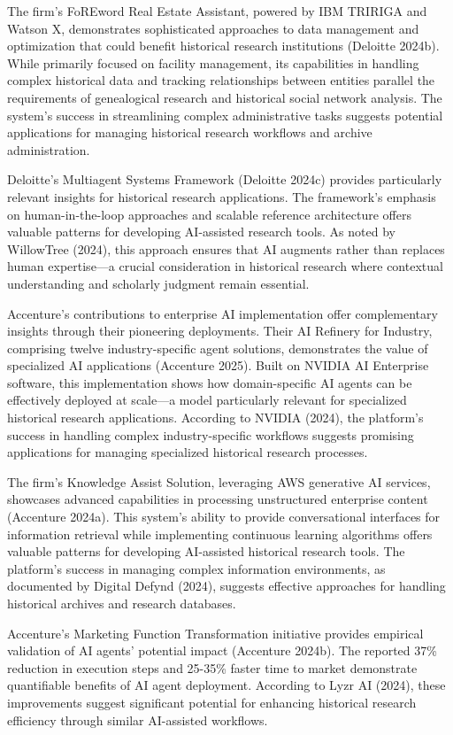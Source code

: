 \documentclass[
]{article}
\begin{document}
The firm's FoREword Real Estate Assistant, powered by IBM TRIRIGA and
Watson X, demonstrates sophisticated approaches to data management and
optimization that could benefit historical research institutions
(Deloitte 2024b). While primarily focused on facility management, its
capabilities in handling complex historical data and tracking
relationships between entities parallel the requirements of genealogical
research and historical social network analysis. The system's success in
streamlining complex administrative tasks suggests potential
applications for managing historical research workflows and archive
administration.

Deloitte's Multiagent Systems Framework (Deloitte 2024c) provides
particularly relevant insights for historical research applications. The
framework's emphasis on human-in-the-loop approaches and scalable
reference architecture offers valuable patterns for developing
AI-assisted research tools. As noted by WillowTree (2024), this approach
ensures that AI augments rather than replaces human expertise---a
crucial consideration in historical research where contextual
understanding and scholarly judgment remain essential.

Accenture's contributions to enterprise AI implementation offer
complementary insights through their pioneering deployments. Their AI
Refinery for Industry, comprising twelve industry-specific agent
solutions, demonstrates the value of specialized AI applications
(Accenture 2025). Built on NVIDIA AI Enterprise software, this
implementation shows how domain-specific AI agents can be effectively
deployed at scale---a model particularly relevant for specialized
historical research applications. According to NVIDIA (2024), the
platform's success in handling complex industry-specific workflows
suggests promising applications for managing specialized historical
research processes.

The firm's Knowledge Assist Solution, leveraging AWS generative AI
services, showcases advanced capabilities in processing unstructured
enterprise content (Accenture 2024a). This system's ability to provide
conversational interfaces for information retrieval while implementing
continuous learning algorithms offers valuable patterns for developing
AI-assisted historical research tools. The platform's success in
managing complex information environments, as documented by Digital
Defynd (2024), suggests effective approaches for handling historical
archives and research databases.

Accenture's Marketing Function Transformation initiative provides
empirical validation of AI agents' potential impact (Accenture 2024b).
The reported 37\% reduction in execution steps and 25-35\% faster time
to market demonstrate quantifiable benefits of AI agent deployment.
According to Lyzr AI (2024), these improvements suggest significant
potential for enhancing historical research efficiency through similar
AI-assisted workflows.
\end{document}
